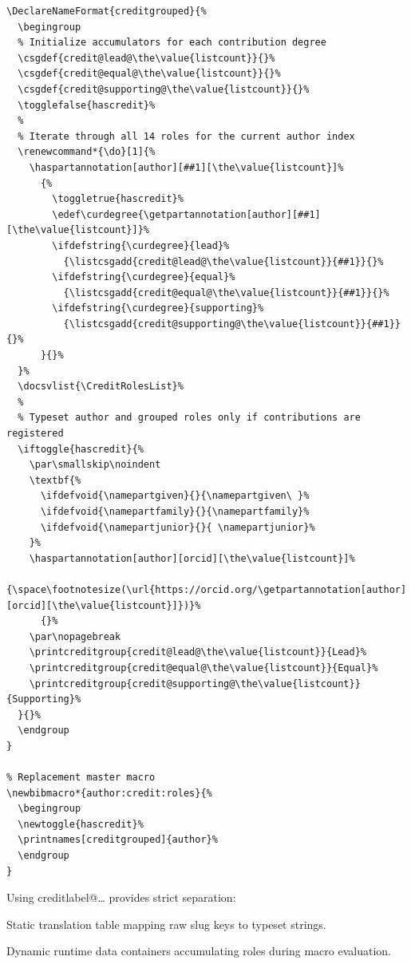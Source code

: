 \documentclass[12pt, twoside]{article}
\begin{document}
\begin{lstlisting}[style=latexExampleForAuthors, escapechar=|, basicstyle=\footnotesize, caption={{Listing CReDiT roles grouped by degree}}, label=lst:biberCReDiTrolesGroupedByDegree]
% Grouped synthesis name-formatting driver
\DeclareNameFormat{creditgrouped}{%
  \begingroup
  % Initialize accumulators for each contribution degree
  \csgdef{credit@lead@\the\value{listcount}}{}%
  \csgdef{credit@equal@\the\value{listcount}}{}%
  \csgdef{credit@supporting@\the\value{listcount}}{}%
  \togglefalse{hascredit}%
  %
  % Iterate through all 14 roles for the current author index
  \renewcommand*{\do}[1]{%
    \haspartannotation[author][##1][\the\value{listcount}]%
      {%
        \toggletrue{hascredit}%
        \edef\curdegree{\getpartannotation[author][##1][\the\value{listcount}]}%
        \ifdefstring{\curdegree}{lead}%
          {\listcsgadd{credit@lead@\the\value{listcount}}{##1}}{}%
        \ifdefstring{\curdegree}{equal}%
          {\listcsgadd{credit@equal@\the\value{listcount}}{##1}}{}%
        \ifdefstring{\curdegree}{supporting}%
          {\listcsgadd{credit@supporting@\the\value{listcount}}{##1}}{}%
      }{}%
  }%
  \docsvlist{\CreditRolesList}%
  %
  % Typeset author and grouped roles only if contributions are registered
  \iftoggle{hascredit}{%
    \par\smallskip\noindent
    \textbf{%
      \ifdefvoid{\namepartgiven}{}{\namepartgiven\ }%
      \ifdefvoid{\namepartfamily}{}{\namepartfamily}%
      \ifdefvoid{\namepartjunior}{}{ \namepartjunior}%
    }%
    \haspartannotation[author][orcid][\the\value{listcount}]%
      {\space\footnotesize(\url{https://orcid.org/\getpartannotation[author][orcid][\the\value{listcount}]})}%
      {}%
    \par\nopagebreak
    \printcreditgroup{credit@lead@\the\value{listcount}}{Lead}%
    \printcreditgroup{credit@equal@\the\value{listcount}}{Equal}%
    \printcreditgroup{credit@supporting@\the\value{listcount}}{Supporting}%
  }{}%
  \endgroup
}

% Replacement master macro
\newbibmacro*{author:credit:roles}{%
  \begingroup
  \newtoggle{hascredit}%
  \printnames[creditgrouped]{author}%
  \endgroup
}
\end{lstlisting}

Using creditlabel@\ldots{} provides strict separation:
\begin{description}[labelwidth =\widthof{\textbf{credit@<degree>@<author\_idx>}}, leftmargin = !]
    \item[creditlabel@<role>] Static translation table mapping raw slug keys to typeset strings.

    \item[credit@<degree>@<author\_idx>] Dynamic runtime data containers accumulating roles during macro evaluation.
\end{description}
\end{document}
